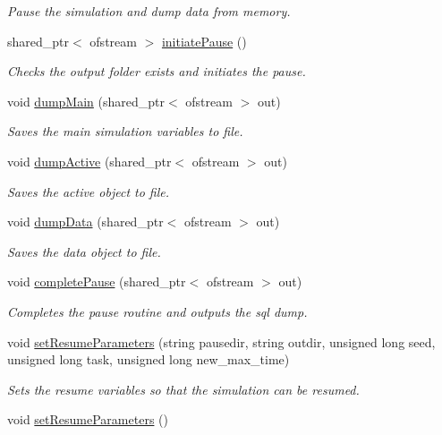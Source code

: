 \begin{DoxyCompactItemize}
\begin{DoxyCompactList}\small\item\em Pause the simulation and dump data from memory. \end{DoxyCompactList}\item 
shared\+\_\+ptr$<$ ofstream $>$ \hyperlink{class_tree_a3cd762da25ff2a313ccc21f4993918f5}{initiate\+Pause} ()
\begin{DoxyCompactList}\small\item\em Checks the output folder exists and initiates the pause. \end{DoxyCompactList}\item 
void \hyperlink{class_tree_aa2af00092c1b4595e91b3443a9abad1a}{dump\+Main} (shared\+\_\+ptr$<$ ofstream $>$ out)
\begin{DoxyCompactList}\small\item\em Saves the main simulation variables to file. \end{DoxyCompactList}\item 
void \hyperlink{class_tree_a9cf1e86171d4a0e22e636bb2cdb01e27}{dump\+Active} (shared\+\_\+ptr$<$ ofstream $>$ out)
\begin{DoxyCompactList}\small\item\em Saves the active object to file. \end{DoxyCompactList}\item 
void \hyperlink{class_tree_aef421096d19ced6d699b84b90a0a5bbc}{dump\+Data} (shared\+\_\+ptr$<$ ofstream $>$ out)
\begin{DoxyCompactList}\small\item\em Saves the data object to file. \end{DoxyCompactList}\item 
void \hyperlink{class_tree_abea4ba1f5340f9690b92008a3b049fba}{complete\+Pause} (shared\+\_\+ptr$<$ ofstream $>$ out)
\begin{DoxyCompactList}\small\item\em Completes the pause routine and outputs the sql dump. \end{DoxyCompactList}\item 
void \hyperlink{class_tree_ac545d844141db977920fc9fd76ce9dbb}{set\+Resume\+Parameters} (string pausedir, string outdir, unsigned long seed, unsigned long task, unsigned long new\+\_\+max\+\_\+time)
\begin{DoxyCompactList}\small\item\em Sets the resume variables so that the simulation can be resumed. \end{DoxyCompactList}\item 
void \hyperlink{class_tree_aeade4bccb8394937a53bc4fbcf2b4300}{set\+Resume\+Parameters} ()\hypertarget{class_tree_aeade4bccb8394937a53bc4fbcf2b4300}{}\label{class_tree_aeade4bccb8394937a53bc4fbcf2b4300}


\end{DoxyCompactItemize}
